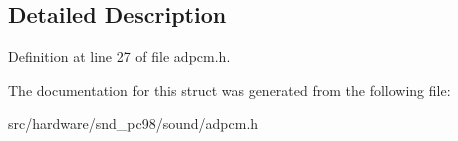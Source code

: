 \subsection{Detailed Description}


Definition at line 27 of file adpcm.\-h.



The documentation for this struct was generated from the following file\-:\begin{DoxyCompactItemize}
\item 
src/hardware/snd\-\_\-pc98/sound/adpcm.\-h\end{DoxyCompactItemize}
